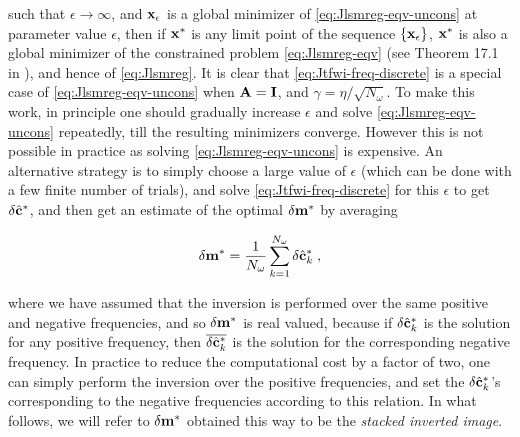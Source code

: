 such that $\epsilon \rightarrow \infty$, and $\mathbf{x}_\epsilon$ is a global minimizer of \eqref{eq:Jlsmreg-eqv-uncons} at parameter value $\epsilon$, then if $\mathbf{x}^{\ast}$ is any limit point of the sequence $\{ \mathbf{x}_\epsilon \}$, $\mathbf{x}^{\ast}$ is also a global minimizer of the constrained problem \eqref{eq:Jlsmreg-eqv} (see Theorem 17.1 in \cite{nocedal2006numerical}), and hence of \eqref{eq:Jlsmreg}. It is clear that \eqref{eq:Jtfwi-freq-discrete} is a special case of \eqref{eq:Jlsmreg-eqv-uncons} when $\mathbf{A} = \mathbf{I}$, and $\gamma = \eta / \sqrt{N_\omega}$. To make this work, in principle one should gradually increase $\epsilon$ and solve \eqref{eq:Jlsmreg-eqv-uncons} repeatedly, till the resulting minimizers converge. However this is not possible in practice as solving \eqref{eq:Jlsmreg-eqv-uncons} is expensive. An alternative strategy is to simply choose a large value of $\epsilon$ (which can be done with a few finite number of trials), and solve \eqref{eq:Jtfwi-freq-discrete} for this $\epsilon$ to get $\delta \hat{\mathbf{c}}^{\ast}$, and then get an estimate of the optimal $\delta \mathbf{m}^{\ast}$ by averaging

\vspace*{-0.5cm}
\begin{equation}
\delta \mathbf{m}^{\ast} = \frac{1}{N_\omega} \sum_{k=1}^{N_\omega} \delta \hat{\mathbf{c}}_{k}^{\ast} \;,
\label{eq:dmavg}
\end{equation}
\vspace*{-0.5cm}

where we have assumed that the inversion is performed over the same positive and negative frequencies, and so $\delta \mathbf{m}^{\ast}$ is real valued, because if $\delta \hat{\mathbf{c}}_{k}^{\ast}$ is the solution for any positive frequency, then $\overline{\delta \hat{\mathbf{c}}_{k}^{\ast}}$ is the solution for the corresponding negative frequency. In practice to reduce the computational cost by a factor of two, one can simply perform the inversion over the positive frequencies, and set the $\delta \hat{\mathbf{c}}^{\ast}_k$'s corresponding to the negative frequencies according to this relation. In what follows, we will refer to $\delta \mathbf{m}^{\ast}$ obtained this way to be the \textit{stacked inverted image}.